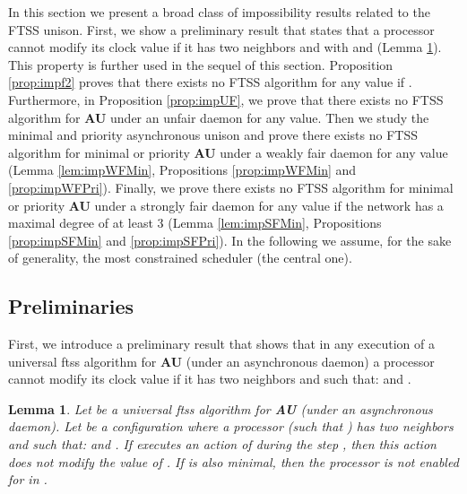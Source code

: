 \documentclass[11pt,english,letterpaper]{article}
\newtheorem{lemma}{Lemma}
\begin{document}
In this section we present a broad class of impossibility results related to the FTSS unison. First, we show a preliminary result that states that a processor cannot modify its clock value if it has two neighbors  and  with  and  (Lemma \ref{lem:blocage}). This property is further used in the sequel of this section. Proposition \ref{prop:impf2} proves that there exists no FTSS algorithm for any  value if . Furthermore, in  Proposition \ref{prop:impUF}, we prove that there exists no FTSS algorithm for \textbf{AU} under an unfair daemon for any  value. Then we study the minimal and priority asynchronous unison and  prove there exists no FTSS algorithm for minimal or priority \textbf{AU} under a weakly fair daemon for any  value (Lemma \ref{lem:impWFMin}, Propositions \ref{prop:impWFMin} and \ref{prop:impWFPri}). Finally, we prove there exists no FTSS algorithm for minimal or priority \textbf{AU} under a strongly fair daemon for any  value if the network has a maximal degree of at least 3 (Lemma \ref{lem:impSFMin}, Propositions \ref{prop:impSFMin} and \ref{prop:impSFPri}). In the following we assume, for the sake of generality, the most constrained scheduler (the central one).

\subsection{Preliminaries}

First, we introduce a preliminary result that shows that in any execution of a universal ftss algorithm for \textbf{AU} (under an asynchronous daemon) a processor cannot modify its clock value if it has two neighbors  and  such that:  and .  

\begin{lemma}\label{lem:blocage}
Let  be a universal ftss algorithm for \textbf{AU} (under an asynchronous daemon). Let  be a configuration where a processor  (such that ) has two neighbors  and  such that:  and . If  executes an action of  during the step , then this action does not modify the value of .   If  is also minimal, then the processor  is not enabled for  in .
\end{lemma}
\end{document}
